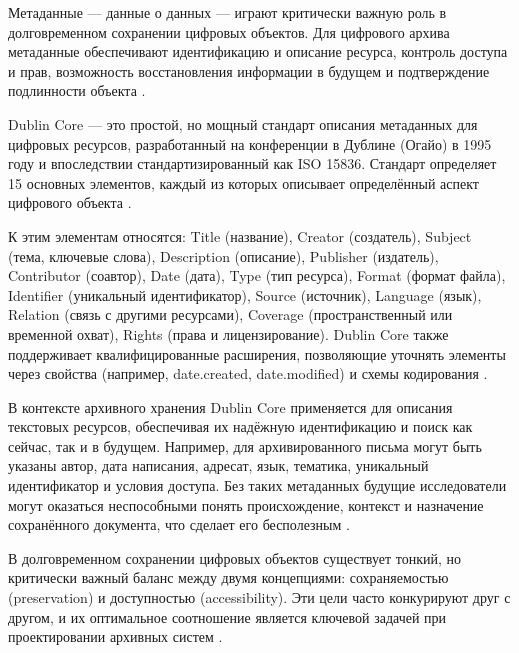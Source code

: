 \documentclass{SibFU-docs}
\begin{document}

Метаданные — данные о данных — играют критически важную роль в долговременном сохранении цифровых объектов. Для цифрового архива метаданные обеспечивают идентификацию и описание ресурса, контроль доступа и прав, возможность восстановления информации в будущем и подтверждение подлинности объекта \cite{DublinCorePapers2005MetadataApproach, ZB_MED2016MetadataPreservation}.

Dublin Core — это простой, но мощный стандарт описания метаданных для цифровых ресурсов, разработанный на конференции в Дублине (Огайо) в 1995 году и впоследствии стандартизированный как ISO 15836. Стандарт определяет 15 основных элементов, каждый из которых описывает определённый аспект цифрового объекта \cite{DublinCore, OrangeLogic2024DublinCore}.

К этим элементам относятся: Title (название), Creator (создатель), Subject (тема, ключевые слова), Description (описание), Publisher (издатель), Contributor (соавтор), Date (дата), Type (тип ресурса), Format (формат файла), Identifier (уникальный идентификатор), Source (источник), Language (язык), Relation (связь с другими ресурсами), Coverage (пространственный или временной охват), Rights (права и лицензирование). Dublin Core также поддерживает квалифицированные расширения, позволяющие уточнять элементы через свойства (например, date.created, date.modified) и схемы кодирования \cite{YouTube2023DublinCoreOmeka}.

В контексте архивного хранения Dublin Core применяется для описания текстовых ресурсов, обеспечивая их надёжную идентификацию и поиск как сейчас, так и в будущем. Например, для архивированного письма могут быть указаны автор, дата написания, адресат, язык, тематика, уникальный идентификатор и условия доступа. Без таких метаданных будущие исследователи могут оказаться неспособными понять происхождение, контекст и назначение сохранённого документа, что сделает его бесполезным \cite{DublinCorePapers2005MetadataApproach}.


В долговременном сохранении цифровых объектов существует тонкий, но критически важный баланс между двумя концепциями: сохраняемостью (preservation) и доступностью (accessibility). Эти цели часто конкурируют друг с другом, и их оптимальное соотношение является ключевой задачей при проектировании архивных систем \cite{Lucidea2024LongTermAccess, ETHLibrary2025DigitalPreservation}.
\end{document}
